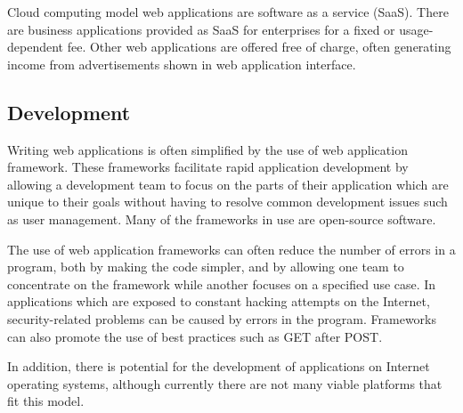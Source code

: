 Cloud computing model web applications are software as a service (SaaS). There are business applications provided as SaaS for enterprises for a fixed or usage-dependent fee. Other web applications are offered free of charge, often generating income from advertisements shown in web application interface\cite{curtisfranklinjrTopTipsSecure2011}.

\subsection{Development}

Writing web applications is often simplified by the use of web application framework. These frameworks facilitate rapid application development by allowing a development team to focus on the parts of their application which are unique to their goals without having to resolve common development issues such as user management. Many of the frameworks in use are open-source software.

The use of web application frameworks can often reduce the number of errors in a program, both by making the code simpler, and by allowing one team to concentrate on the framework while another focuses on a specified use case. In applications which are exposed to constant hacking attempts on the Internet, security-related problems can be caused by errors in the program. Frameworks can also promote the use of best practices such as GET after POST.

In addition, there is potential for the development of applications on Internet operating systems, although currently there are not many viable platforms that fit this model\cite{docforgeFrameworkDocForgeProgramming2010}.